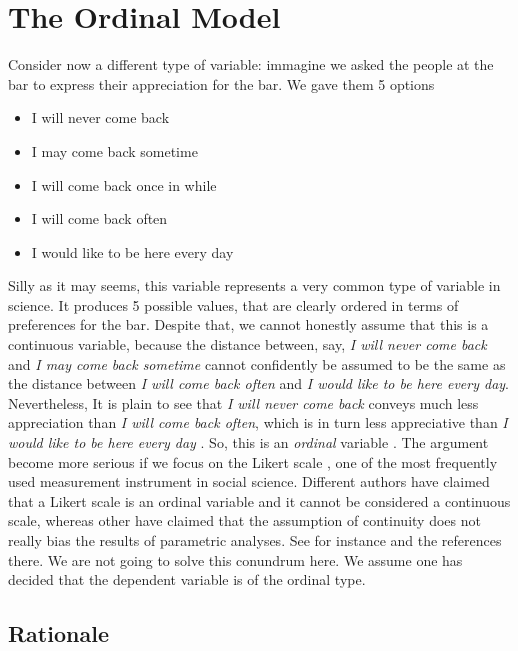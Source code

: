 \documentclass[
]{book}
\providecommand{\tightlist}{%
  \setlength{\itemsep}{0pt}\setlength{\parskip}{0pt}}
\begin{document}
\hypertarget{ordinal}{%
\section{The Ordinal Model}\label{ordinal}}

Consider now a different type of variable: immagine we asked the people at the bar to express their appreciation for the bar. We gave them 5 options

\begin{itemize}
\tightlist
\item
  I will never come back
\item
  I may come back sometime
\item
  I will come back once in while
\item
  I will come back often
\item
  I would like to be here every day
\end{itemize}

Silly as it may seems, this variable represents a very common type of variable in science. It produces 5 possible values, that are clearly ordered in terms of preferences for the bar. Despite that, we cannot honestly assume that this is a continuous variable, because the distance between, say, \emph{I will never come back} and \emph{I may come back sometime} cannot confidently be assumed to be the same as the distance between \emph{I will come back often} and \emph{I would like to be here every day}. Nevertheless, It is plain to see that \emph{I will never come back} conveys much less appreciation than \emph{I will come back often}, which is in turn less appreciative than \emph{I would like to be here every day} . So, this is an \emph{ordinal} variable \citep{stevens1946theory}. The argument become more serious if we focus on the Likert scale \citep{likert1932technique}, one of the most frequently used measurement instrument in social science. Different authors have claimed that a Likert scale is an ordinal variable and it cannot be considered a continuous scale, whereas other have claimed that the assumption of continuity does not really bias the results of parametric analyses. See for instance \citet{wu2017can} and the references there. We are not going to solve this conundrum here. We assume one has decided that the dependent variable is of the ordinal type.

\hypertarget{rationale-1}{%
\subsection{Rationale}\label{rationale-1}}
\end{document}
